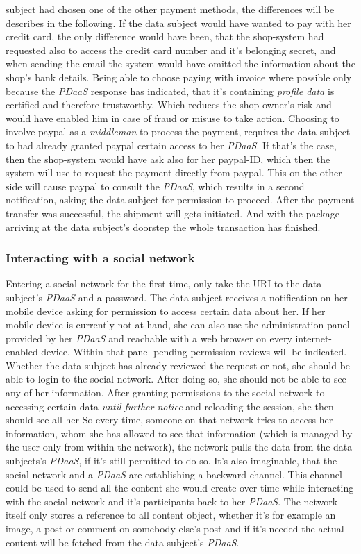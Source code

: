 \documentclass[12pt,english,a4paper,titlepage,cleardoublepage=empty,dottedtoc]{report}
\begin{document}
subject had chosen one of the other payment methods, the differences
will be describes in the following. If the data subject would have
wanted to pay with her credit card, the only difference would have been,
that the shop-system had requested also to access the credit card number
and it's belonging secret, and when sending the email the system would
have omitted the information about the shop's bank details. Being able
to choose paying with invoice where possible only because the
\emph{PDaaS} response has indicated, that it's containing \emph{profile
data} is certified and therefore trustworthy. Which reduces the shop
owner's risk and would have enabled him in case of fraud or misuse to
take action. Choosing to involve paypal as a \emph{middleman} to process
the payment, requires the data subject to had already granted paypal
certain access to her \emph{PDaaS}. If that's the case, then the
shop-system would have ask also for her paypal-ID, which then the system
will use to request the payment directly from paypal. This on the other
side will cause paypal to consult the \emph{PDaaS}, which results in a
second notification, asking the data subject for permission to proceed.
After the payment transfer was successful, the shipment will gets
initiated. And with the package arriving at the data subject's doorstep
the whole transaction has finished.

\subsubsection{Interacting with a social
network}\label{interacting-with-a-social-network}

Entering a social network for the first time, only take the URI to the
data subject's \emph{PDaaS} and a password. The data subject receives a
notification on her mobile device asking for permission to access
certain data about her. If her mobile device is currently not at hand,
she can also use the administration panel provided by her \emph{PDaaS}
and reachable with a web browser on every internet-enabled device.
Within that panel pending permission reviews will be indicated. Whether
the data subject has already reviewed the request or not, she should be
able to login to the social network. After doing so, she should not be
able to see any of her information. After granting permissions to the
social network to accessing certain data \emph{until-further-notice} and
reloading the session, she then should see all her So every time,
someone on that network tries to access her information, whom she has
allowed to see that information (which is managed by the user only from
within the network), the network pulls the data from the data subjects's
\emph{PDaaS}, if it's still permitted to do so. It's also imaginable,
that the social network and a \emph{PDaaS} are establishing a backward
channel. This channel could be used to send all the content she would
create over time while interacting with the social network and it's
participants back to her \emph{PDaaS}. The network itself only stores a
reference to all content object, whether it's for example an image, a
post or comment on somebody else's post and if it's needed the actual
content will be fetched from the data subject's \emph{PDaaS}.
\end{document}
